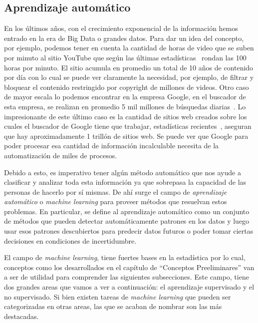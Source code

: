 \subsection{Aprendizaje automático}

	En los últimos años, con el crecimiento exponencial de la información hemos entrado en la era de Big Data o grandes datos. Para dar un idea del concepto, por ejemplo, podemos tener en cuenta la cantidad de horas de video que se suben por minuto al sitio YouTube que según las últimas estadísticas~\cite{YoutubeStats} rondan las 100 horas por minuto. El sitio acumula en promedio un total de 10 años de contenido por día con lo cual se puede ver claramente la necesidad, por ejemplo, de filtrar y bloquear el contenido restringido por copyright de millones de videos. Otro caso de mayor escala lo podemos encontrar en la empresa Google, en el buscador de esta empresa, se realizan en promedio 5 mil millones de búsquedas diarias~\cite{GoogleSearches}. Lo impresionante de este último caso es la cantidad de sitios web creados sobre los cuales el buscador de Google tiene que trabajar, estadísticas recientes~\cite{Websites}, aseguran que hay aproximadamente 1 trillón de sitios web. Se puede ver que Google para poder procesar esa cantidad de información incalculable necesita de la automatización de miles de procesos.
	
	 Debido a esto, es imperativo tener algún método automático que nos ayude a clasificar y analizar toda esta información ya que sobrepasa la capacidad de las personas de hacerlo por sí mismas. De ahí surge el campo de \textit{aprendizaje automático} o \textit{machine learning} para proveer métodos que resuelvan estos problemas. En particular, se define al aprendizaje automático como un conjunto de métodos que pueden detectar automáticamente patrones en los datos y luego usar esos patrones descubiertos para predecir datos futuros o poder tomar ciertas decisiones en condiciones de incertidumbre.
	 
	 El campo de \textit{machine learning}, tiene fuertes bases en la estadística por lo cual, conceptos como los desarrollados en el capítulo de ``Conceptos Preeliminares'' van a ser de utilidad para comprender las siguientes subsecciones. Este campo, tiene dos grandes areas que vamos a ver a continuación: el aprendizaje supervisado y el no supervisado. Si bien existen tareas de \textit{machine learning} que pueden ser categorizadas en otras areas, las que se acaban de nombrar son las más destacadas.
	
	

